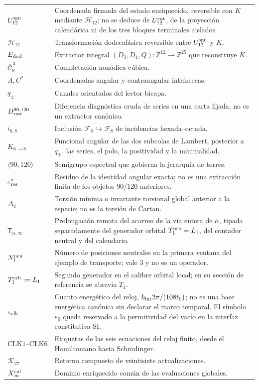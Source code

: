 \begin{longtable}{@{}p{}p{}@{}}
\(U_{12}^{\rm sgn}\)&Coordenada firmada del estado enriquecido, reversible
con \(K\) mediante \(\mathcal H_{12}\); no se deduce de
\(U_{12}^{\rm cat}\), de la proyección calendárica ni de los tres bloques terminales
aislados.\\
\(\mathcal H_{12}\)&Transformación dodecafásica reversible entre
\(U_{12}^{\rm sgn}\) y \(K\).\\
\(\mathcal E_{\rm dod}\)&Extractor integral
\((D_3,D_4,Q):\mathbb Z^{12}\to\mathbb Z^{25}\) que reconstruye \(K\).\\
\(\overline{\mathcal C}_9^{\,3}\)&Completación nonádica cúbica.\\
\(A,C^*\)&Coordenadas angular y contraangular intrínsecas.\\
\(q_\pm\)&Canales orientados del lector bicapa.\\
\(D_{\rm raw}^{90,120}\)&Diferencia diagnóstica cruda de series en una
carta fijada; no es un extractor canónico.\\
\(\iota_{6,8}\)&Inclusión
\(\mathcal F_6\hookrightarrow\mathcal F_8\) de incidencias hexada--octada.\\
\(K_{6\to8}\)&Funcional angular de las dos subcolas de Lambert, posterior a
\(q_\pm\), las series, el polo, la positividad y la minimalidad.\\
\(\langle90,120\rangle\)&Semigrupo espectral que gobierna la jerarquía de
torres.\\
\(\varepsilon_{\rm res}^{\circ}\)&Residuo de la identidad angular exacta;
no es una extracción finita de los objetos 90/120 anteriores.\\
\(\Delta_4\)&Torsión mínima o invariante torsional global anterior a la
especie; no es la torsión de Cartan.\\
\(\mathsf T_{\alpha,\infty}\)&Prolongación remota del acarreo de la vía
entera de \(\alpha\), tipada separadamente del generador orbital
\(T_1^{\rm orb}=L_1\), del contador neutral y del calendario.\\
\(N_1^{\rm neu}\)&Número de posiciones neutrales en la primera ventana del
ejemplo de transporte; vale $3$ y no es un operador.\\
\(T_1^{\rm orb}:=L_1\)&Segundo generador en el calibre orbital local; en su
sección de referencia se abrevia \(T_1\).\\
\(\varepsilon_{\rm clk}\)&Cuanto energético del reloj,
\(\hbar_{\rm int}2\pi/(108t_0)\); no es una base energética canónica sin
declarar el marco temporal. El símbolo \(\varepsilon_0\) queda reservado a
la permitividad del vacío en la interfaz constitutiva SI.\\
\(\mathrm{CLK}1\text{--}\mathrm{CLK}6\)&Etiquetas de las seis ecuaciones del
reloj finito, desde el Hamiltoniano hasta Schrödinger.\\
\(\mathcal K_{27}\)&Retorno compuesto de veintisiete actualizaciones.\\
\(X_\infty^{\rm cal}\)&Dominio enriquecido común de las evaluaciones
globales.\\
\bottomrule
\end{longtable}

